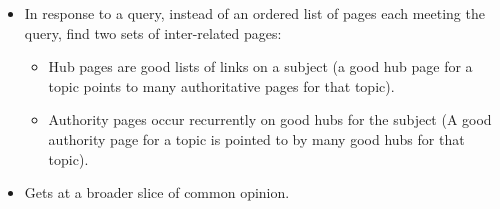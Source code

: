 \begin{breakbox}
\begin{itemize}
	\item In response to a query, instead of an ordered list of pages each meeting the query, find two sets of inter-related pages:
		\begin{itemize}
			\item Hub pages are good lists of links on a subject (a good hub page for a topic points to many authoritative pages for that topic).
			\item Authority pages occur recurrently on good hubs for the subject (A good authority page for a topic is pointed to by many good hubs for that topic).
		\end{itemize}
	\item Gets at a broader slice of common opinion.
\end{itemize}
\end{breakbox}

\begin{breakbox}

\end{breakbox}
















